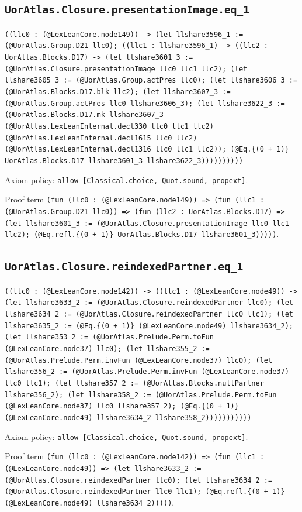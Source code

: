 \documentclass[11pt]{article}
\begin{document}
\subsection*{\texttt{UorAtlas.Closure.presentationImage.eq\_1}}
\noindent\texttt{((llc0 : (@LexLeanCore.node149)) -> (let llshare3596\_1 := (@UorAtlas.Group.D21 llc0); ((llc1 : llshare3596\_1) -> ((llc2 : UorAtlas.Blocks.D17) -> (let llshare3601\_3 := (@UorAtlas.Closure.presentationImage llc0 llc1 llc2); (let llshare3605\_3 := (@UorAtlas.Group.actPres llc0); (let llshare3606\_3 := (@UorAtlas.Blocks.D17.blk llc2); (let llshare3607\_3 := (@UorAtlas.Group.actPres llc0 llshare3606\_3); (let llshare3622\_3 := (@UorAtlas.Blocks.D17.mk llshare3607\_3 (@UorAtlas.LexLeanInternal.decl330 llc0 llc1 llc2) (@UorAtlas.LexLeanInternal.decl1615 llc0 llc2) (@UorAtlas.LexLeanInternal.decl1316 llc0 llc1 llc2)); (@Eq.\{(0 + 1)\} UorAtlas.Blocks.D17 llshare3601\_3 llshare3622\_3))))))))))}\par
\noindent Axiom policy: \texttt{allow [Classical.choice, Quot.sound, propext]}.\par
\noindent Proof term \texttt{(fun (llc0 : (@LexLeanCore.node149)) => (fun (llc1 : (@UorAtlas.Group.D21 llc0)) => (fun (llc2 : UorAtlas.Blocks.D17) => (let llshare3601\_3 := (@UorAtlas.Closure.presentationImage llc0 llc1 llc2); (@Eq.refl.\{(0 + 1)\} UorAtlas.Blocks.D17 llshare3601\_3)))))}.\par
\subsection*{\texttt{UorAtlas.Closure.reindexedPartner.eq\_1}}
\noindent\texttt{((llc0 : (@LexLeanCore.node142)) -> ((llc1 : (@LexLeanCore.node49)) -> (let llshare3633\_2 := (@UorAtlas.Closure.reindexedPartner llc0); (let llshare3634\_2 := (@UorAtlas.Closure.reindexedPartner llc0 llc1); (let llshare3635\_2 := (@Eq.\{(0 + 1)\} (@LexLeanCore.node49) llshare3634\_2); (let llshare353\_2 := (@UorAtlas.Prelude.Perm.toFun (@LexLeanCore.node37) llc0); (let llshare355\_2 := (@UorAtlas.Prelude.Perm.invFun (@LexLeanCore.node37) llc0); (let llshare356\_2 := (@UorAtlas.Prelude.Perm.invFun (@LexLeanCore.node37) llc0 llc1); (let llshare357\_2 := (@UorAtlas.Blocks.nullPartner llshare356\_2); (let llshare358\_2 := (@UorAtlas.Prelude.Perm.toFun (@LexLeanCore.node37) llc0 llshare357\_2); (@Eq.\{(0 + 1)\} (@LexLeanCore.node49) llshare3634\_2 llshare358\_2)))))))))))}\par
\noindent Axiom policy: \texttt{allow [Classical.choice, Quot.sound, propext]}.\par
\noindent Proof term \texttt{(fun (llc0 : (@LexLeanCore.node142)) => (fun (llc1 : (@LexLeanCore.node49)) => (let llshare3633\_2 := (@UorAtlas.Closure.reindexedPartner llc0); (let llshare3634\_2 := (@UorAtlas.Closure.reindexedPartner llc0 llc1); (@Eq.refl.\{(0 + 1)\} (@LexLeanCore.node49) llshare3634\_2)))))}.\par
\end{document}
